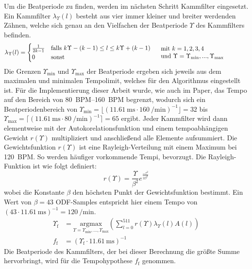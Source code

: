 {{{			%
			Um die Beatperiode zu finden,
				werden im nächsten Schritt Kammfilter eingesetzt.
			Ein Kammfilter $\lambda_\Upsilon(l)$ besteht aus vier immer kleiner und breiter werdenden Zähnen,
				welche sich genau an den Vielfachen der Beatperiode $\Upsilon$ des Kammfilters befinden.
			\begin{equation}
				\lambda_\Upsilon(l) =
				\begin{cases}
					\frac{1}{2k - 1} & \text{falls } k \Upsilon - (k - 1) \leq l \leq k \Upsilon + (k - 1) \\
					0 & \text{sonst}
				\end{cases}
				\hspace{5mm}
				\text{\parbox[c]{5cm}{
					mit $k = 1, 2, 3, 4$ \\
					und $\Upsilon = \Upsilon_\text{min}, ..., \Upsilon_\text{max}$
				}}
			\end{equation}
			Die Grenzen $\Upsilon_\text{min}$ und $\Upsilon_\text{max}$ der Beatperiode ergeben sich jeweils aus dem maximalen und minimalen Tempolimit,
				welches für den Algorithmus eingestellt ist.
			Für die Implementierung dieser Arbeit wurde,
				wie auch im Paper,
				das Tempo auf den Bereich von \SIrange{80}{160}{BPM} begrenzt,
				wodurch sich ein Beatperiodenbereich
				von $\Upsilon_\text{min} = \lfloor(\SI{11.61}{\milli\second} \cdot \SI{160}{\per\minute})^{-1}\rfloor = 32$
				bis $\Upsilon_\text{max} = \lceil(\SI{11.61}{\milli\second} \cdot \SI{80}{\per\minute})^{-1}\rceil = 65$
				ergibt.
			Jeder Kammfilter wird dann elementweise mit der Autokorelationsfunktion und einem tempoabhängigen Gewicht $r(\Upsilon)$ multipliziert
				und anschließend alle Elemente aufsummiert.
			Die Gewichtsfunktion $r(\Upsilon)$ ist eine Rayleigh-Verteilung mit einem Maximum bei \SI{120}{BPM}.
			So werden häufiger vorkommende Tempi, bevorzugt.
			Die Rayleigh-Funktion ist wie folgt definiert:
			\begin{equation}
				r(\Upsilon) = \frac{\Upsilon}{\beta^2}e^{\frac{-\tau^2}{2\beta^2}}
			\end{equation}
			wobei die Konstante $\beta$ den höchsten Punkt der Gewichtsfunktion bestimmt.
			Ein Wert von $\beta = 43$ ODF-Samples entspricht hier einem Tempo von
				$(43 \cdot \SI{11.61}{\milli\second})^{-1} = \SI{120}{\per\minute}$.
			\begin{align}
				\Upsilon_\text{f} &=
					\underset{\Upsilon = \Upsilon_\text{min}, ..., \Upsilon_\text{max}}{\text{argmax}}
					\left( \sum_{l = 0}^{511} r(\Upsilon) \lambda_\Upsilon(l) A(l) \right) \\
				f_\text{f} &= (\Upsilon_\text{f} \cdot \SI{11.61}{\milli\second})^{-1}
			\end{align}
			Die Beatperiode des Kammfilters,
				der bei dieser Berechnung die größte Summe hervorbringt,
				wird für die Tempohypothese $f_\text{f}$ genommen.

}}}
